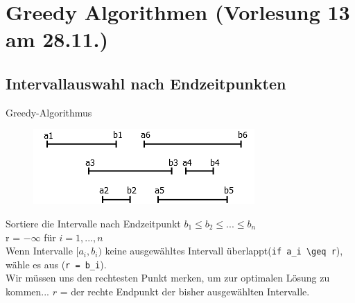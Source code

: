 \section{Greedy Algorithmen \tiny (Vorlesung 13 am 28.11.)}

\subsection{Intervallauswahl nach Endzeitpunkten}
Greedy-Algorithmus 
\begin{figure}[h]
    \begin{center}
        \includegraphics[width=\textwidth / 3]{../GFX/vl13_1.png}
        \label{fig:vl13_1}
    \end{center}
\end{figure}
Sortiere die Intervalle nach Endzeitpunkt $b_1 \leq b_2 \leq ... \leq b_n$\\
r = $-\infty$
für $i = 1,...,n$\\ 
Wenn Intervalle $[a_i,b_i)$ keine ausgewähltes Intervall überlappt(\lstinline!if a_i \geq r!), wähle es aus (\lstinline!r = b_i!).\\
Wir müssen uns den rechtesten Punkt merken, um zur optimalen Lösung zu kommen...
$r$ = der rechte Endpunkt der bisher ausgewählten Intervalle.
